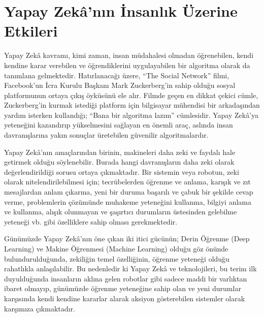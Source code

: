 \documentclass{article}
\begin{document}
\section{Yapay Zekâ’nın İnsanlık Üzerine Etkileri}
\begin{multicols}{2}
Yapay Zekâ kavramı, kimi zaman, insan müdahalesi olmadan öğrenebilen, kendi kendine karar verebilen ve öğrendiklerini uygulayabilen bir algoritma olarak
da tanımlana gelmektedir. Hatırlanacağı üzere, “The Social Network” filmi, Facebook’un İcra Kurulu Başkanı Mark Zuckerberg’in sahip olduğu sosyal platformunun ortaya çıkış öyküsünü ele alır. Filmde geçen en dikkat çekici cümle, Zuckerberg’in kurmak istediği platform için bilgisayar mühendisi bir arkadaşından
yardım isterken kullandığı; “Bana bir algoritma lazım” cümlesidir. Yapay Zekâ’ya
yeteneğini kazandırıp yükselmesini sağlayan en önemli araç, aslında insan davranışlarına yakın sonuçlar üretebilen güvenilir algoritmalardır. 

Yapay Zekâ’nın amaçlarından birinin, makineleri daha zeki ve faydalı hale getirmek olduğu söylenebilir. Burada hangi davranışların daha zeki olarak değerlendirildiği sorusu ortaya çıkmaktadır. Bir sistemin veya robotun, zeki olarak
nitelendirilebilmesi için; tecrübelerden öğrenme ve anlama, karışık ve zıt mesajlardan anlam çıkarma, yeni bir duruma başarılı ve çabuk bir şekilde cevap
verme, problemlerin çözümünde muhakeme yeteneğini kullanma, bilgiyi anlama ve kullanma, alışık olunmayan ve şaşırtıcı durumların üstesinden gelebilme
yeteneği vb. gibi özelliklere sahip olması gerekmektedir.

Günümüzde Yapay Zekâ’nın öne çıkan iki itici gücünün; Derin Öğrenme (Deep
Learning) ve Makine Öğrenmesi (Machine Learning) olduğu göz önünde bulundurulduğunda, zekiliğin temel özelliğinin, öğrenme yeteneği olduğu rahatlıkla
anlaşılabilir. Bu nedenledir ki Yapay Zekâ ve teknolojileri, bu terim ilk duyulduğunda insanların aklına gelen robotlar gibi sadece maddi bir varlıktan ibaret olmayıp, günümüzde öğrenme yeteneğine sahip olan ve yeni durumlar karşısında
kendi kendine kararlar alarak aksiyon gösterebilen sistemler olarak karşımıza
çıkmaktadır.


\end{multicols}
\end{document}
